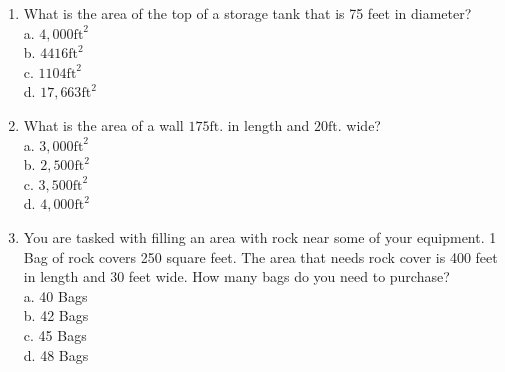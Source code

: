 \documentclass[10pt]{article}
\begin{document}
\begin{enumerate}
  \item What is the area of the top of a storage tank that is 75 feet in diameter?\\
a. $4,000 \mathrm{ft}^{2}$\\
b. $4416 \mathrm{ft}^{2}$\\
c. $1104 \mathrm{ft}^{2}$\\
d. $17,663 \mathrm{ft}^{2}$

  \item What is the area of a wall $175 \mathrm{ft}$. in length and $20 \mathrm{ft}$. wide?\\
a. $3,000 \mathrm{ft}^{2}$\\
b. $2,500 \mathrm{ft}^{2}$\\
c. $3,500 \mathrm{ft}^{2}$\\
d. $4,000 \mathrm{ft}^{2}$

  \item You are tasked with filling an area with rock near some of your equipment. 1 Bag of rock covers 250 square feet. The area that needs rock cover is 400 feet in length and 30 feet wide. How many bags do you need to purchase?\\
a. 40 Bags\\
b. 42 Bags\\
c. 45 Bags\\
d. 48 Bags

\end{enumerate}
\end{document}
